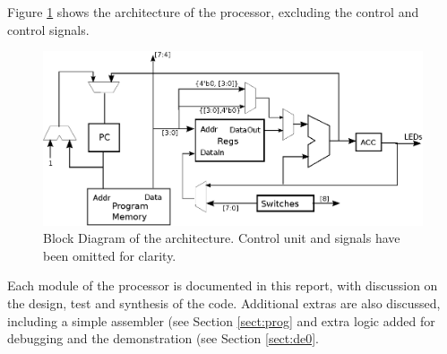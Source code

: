 Figure \ref{fig:arch} shows the architecture of the processor, excluding the control and control signals.

\begin{figure}
\includegraphics[width=\textwidth]{Figures/architecture.eps}
\caption{Block Diagram of the architecture. Control unit and signals have been omitted for clarity.}
\label{fig:arch}
\end{figure}

Each module of the processor is documented in this report, with discussion on the design, test and synthesis of the code. 
Additional extras are also discussed, including a simple assembler (see Section \ref{sect:prog} and extra logic added for debugging and the demonstration (see Section \ref{sect:de0}.
